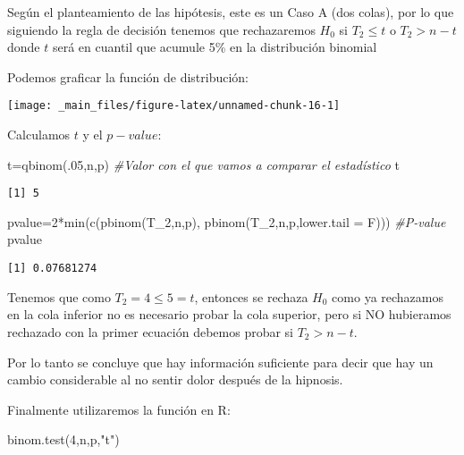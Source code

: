 \documentclass[
  a4paper,
  oneside,
  openany]{book}
\newenvironment{Shaded}{\begin{snugshade}}{\end{snugshade}}
\newcommand{\AttributeTok}[1]{\textcolor[rgb]{0.77,0.63,0.00}{#1}}
\newcommand{\CommentTok}[1]{\textcolor[rgb]{0.56,0.35,0.01}{\textit{#1}}}
\newcommand{\DecValTok}[1]{\textcolor[rgb]{0.00,0.00,0.81}{#1}}
\newcommand{\FunctionTok}[1]{\textcolor[rgb]{0.00,0.00,0.00}{#1}}
\newcommand{\NormalTok}[1]{#1}
\newcommand{\OtherTok}[1]{\textcolor[rgb]{0.56,0.35,0.01}{#1}}
\newcommand{\SpecialCharTok}[1]{\textcolor[rgb]{0.00,0.00,0.00}{#1}}
\newcommand{\StringTok}[1]{\textcolor[rgb]{0.31,0.60,0.02}{#1}}
\begin{document}
Según el planteamiento de las hipótesis, este es un Caso A (dos colas), por lo que siguiendo la regla de decisión tenemos que rechazaremos \(H_0\) si \(T_2 \leq t\) o \(T_2>n-t\) donde \(t\) será en cuantil que acumule 5\% en la distribución binomial

Podemos graficar la función de distribución:

\begin{center}\texttt{[image: \_main\_files/figure-latex/unnamed-chunk-16-1]} \end{center}

Calculamos \(t\) y el \(p-value\):

\begin{Shaded}
\begin{Highlighting}[]
\NormalTok{t}\OtherTok{=}\FunctionTok{qbinom}\NormalTok{(.}\DecValTok{05}\NormalTok{,n,p)       }\CommentTok{\#Valor con el que vamos a comparar el estadístico}
\NormalTok{t}
\end{Highlighting}
\end{Shaded}

\begin{verbatim}
[1] 5
\end{verbatim}

\begin{Shaded}
\begin{Highlighting}[]
\NormalTok{pvalue}\OtherTok{=}\DecValTok{2}\SpecialCharTok{*}\FunctionTok{min}\NormalTok{(}\FunctionTok{c}\NormalTok{(}\FunctionTok{pbinom}\NormalTok{(T\_2,n,p), }\FunctionTok{pbinom}\NormalTok{(T\_2,n,p,}\AttributeTok{lower.tail =}\NormalTok{ F)))   }\CommentTok{\#P{-}value}
\NormalTok{pvalue}
\end{Highlighting}
\end{Shaded}

\begin{verbatim}
[1] 0.07681274
\end{verbatim}

Tenemos que como \(T_2=4\leq 5 =t\), entonces se rechaza \(H_0\) como ya rechazamos en la cola inferior no es necesario probar la cola superior, pero si NO hubieramos rechazado con la primer ecuación debemos probar si \(T_2>n-t\).

Por lo tanto se concluye que hay información suficiente para decir que hay un cambio considerable al no sentir dolor después de la hipnosis.

Finalmente utilizaremos la función en R:

\begin{Shaded}
\begin{Highlighting}[]
\FunctionTok{binom.test}\NormalTok{(}\DecValTok{4}\NormalTok{,n,p,}\StringTok{"t"}\NormalTok{)}
\end{Highlighting}
\end{Shaded}
\end{document}

